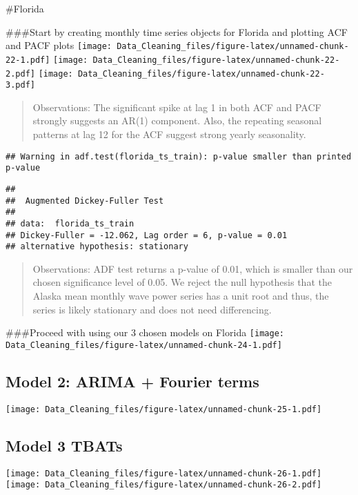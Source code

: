 \documentclass[
]{article}
\begin{document}
\#Florida

\#\#\#Start by creating monthly time series objects for Florida and
plotting ACF and PACF plots
\texttt{[image: Data\_Cleaning\_files/figure-latex/unnamed-chunk-22-1.pdf]}
\texttt{[image: Data\_Cleaning\_files/figure-latex/unnamed-chunk-22-2.pdf]}
\texttt{[image: Data\_Cleaning\_files/figure-latex/unnamed-chunk-22-3.pdf]}

\begin{quote}
Observations: The significant spike at lag 1 in both ACF and PACF
strongly suggests an AR(1) component. Also, the repeating seasonal
patterns at lag 12 for the ACF suggest strong yearly seasonality.
\end{quote}

\begin{verbatim}
## Warning in adf.test(florida_ts_train): p-value smaller than printed p-value
\end{verbatim}

\begin{verbatim}
## 
##  Augmented Dickey-Fuller Test
## 
## data:  florida_ts_train
## Dickey-Fuller = -12.062, Lag order = 6, p-value = 0.01
## alternative hypothesis: stationary
\end{verbatim}

\begin{quote}
Observations: ADF test returns a p-value of 0.01, which is smaller than
our chosen significance level of 0.05. We reject the null hypothesis
that the Alaska mean monthly wave power series has a unit root and thus,
the series is likely stationary and does not need differencing.
\end{quote}

\#\#\#Proceed with using our 3 chosen models on Florida
\texttt{[image: Data\_Cleaning\_files/figure-latex/unnamed-chunk-24-1.pdf]}

\subsection{Model 2: ARIMA + Fourier
terms}\label{model-2-arima-fourier-terms-1}

\texttt{[image: Data\_Cleaning\_files/figure-latex/unnamed-chunk-25-1.pdf]}

\subsection{Model 3 TBATs}\label{model-3-tbats-1}

\texttt{[image: Data\_Cleaning\_files/figure-latex/unnamed-chunk-26-1.pdf]}
\texttt{[image: Data\_Cleaning\_files/figure-latex/unnamed-chunk-26-2.pdf]}
\end{document}

